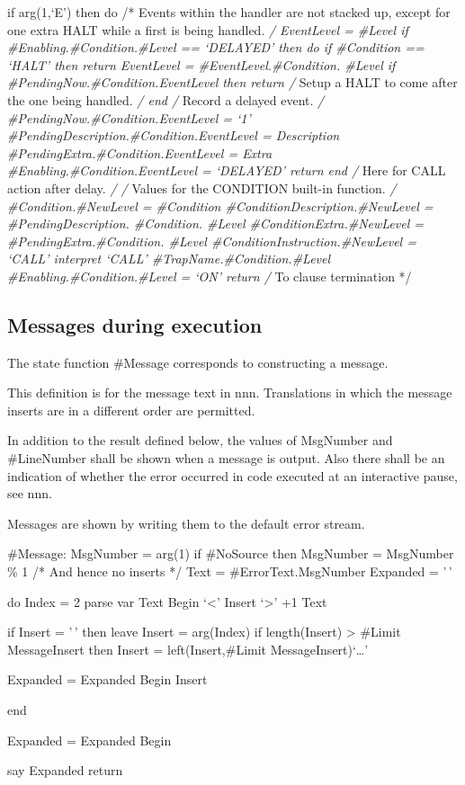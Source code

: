 if arg(1,`E') then do /* Events within the handler are not stacked up,
except for one extra HALT while a first is being handled. \emph{/
EventLevel = \#Level if \#Enabling.\#Condition.\#Level == `DELAYED' then
do if \#Condition == `HALT' then return EventLevel =
\#EventLevel.\#Condition. \#Level if \#PendingNow.\#Condition.EventLevel
then return /} Setup a HALT to come after the one being handled. \emph{/
end /} Record a delayed event. \emph{/
\#PendingNow.\#Condition.EventLevel = `1'
\#PendingDescription.\#Condition.EventLevel = Description
\#PendingExtra.\#Condition.EventLevel = Extra
\#Enabling.\#Condition.EventLevel = `DELAYED' return end /} Here for
CALL action after delay. \emph{/ /} Values for the CONDITION built-in
function. \emph{/ \#Condition.\#NewLevel = \#Condition
\#ConditionDescription.\#NewLevel = \#PendingDescription. \#Condition.
\#Level \#ConditionExtra.\#NewLevel = \#PendingExtra.\#Condition.
\#Level \#ConditionInstruction.\#NewLevel = `CALL' interpret `CALL'
\#TrapName.\#Condition.\#Level \#Enabling.\#Condition.\#Level = `ON'
return /} To clause termination */

\subsection{Messages during execution}\label{messages-during-execution}

The state function \#Message corresponds to constructing a message.

This definition is for the message text in nnn. Translations in which
the message inserts are in a different order are permitted.

In addition to the result defined below, the values of MsgNumber and
\#LineNumber shall be shown when a message is output. Also there shall
be an indication of whether the error occurred in code executed at an
interactive pause, see nnn.

Messages are shown by writing them to the default error stream.

\#Message: MsgNumber = arg(1) if \#NoSource then MsgNumber = MsgNumber
\% 1 /* And hence no inserts */ Text = \#ErrorText.MsgNumber Expanded =
'\,'

do Index = 2 parse var Text Begin `\textless{}' Insert `\textgreater{}'
+1 Text

if Insert = '\,' then leave Insert = arg(Index) if length(Insert)
\textgreater{} \#Limit MessageInsert then Insert = left(Insert,\#Limit
MessageInsert)`\ldots{}'

Expanded = Expanded \textbar\textbar{} Begin \textbar\textbar{} Insert

end

Expanded = Expanded \textbar\textbar{} Begin

say Expanded return
